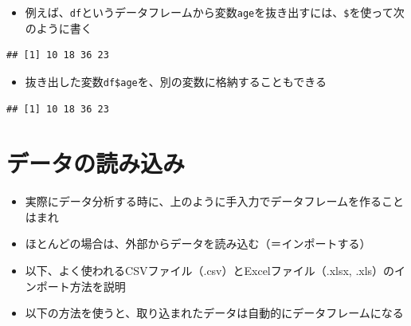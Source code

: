 \documentclass[
]{book}
\newenvironment{Shaded}{\begin{snugshade}}{\end{snugshade}}
\newcommand{\NormalTok}[1]{#1}
\newcommand{\OtherTok}[1]{\textcolor[rgb]{0.56,0.35,0.01}{#1}}
\newcommand{\SpecialCharTok}[1]{\textcolor[rgb]{0.00,0.00,0.00}{#1}}
\providecommand{\tightlist}{%
  \setlength{\itemsep}{0pt}\setlength{\parskip}{0pt}}
\begin{document}
\begin{itemize}
\tightlist
\item
  例えば、\texttt{df}というデータフレームから変数\texttt{age}を抜き出すには、\texttt{\$}を使って次のように書く
\end{itemize}

\begin{Shaded}
\end{Shaded}

\begin{verbatim}
## [1] 10 18 36 23
\end{verbatim}

\begin{itemize}
\tightlist
\item
  抜き出した変数\texttt{df\$age}を、別の変数に格納することもできる
\end{itemize}

\begin{Shaded}
\end{Shaded}

\begin{verbatim}
## [1] 10 18 36 23
\end{verbatim}

\hypertarget{ux30c7ux30fcux30bfux306eux8aadux307fux8fbcux307f-1}{%
\section{データの読み込み}\label{ux30c7ux30fcux30bfux306eux8aadux307fux8fbcux307f-1}}

\begin{itemize}
\tightlist
\item
  実際にデータ分析する時に、上のように手入力でデータフレームを作ることはまれ
\item
  ほとんどの場合は、外部からデータを読み込む（＝インポートする）
\item
  以下、よく使われるCSVファイル（.csv）とExcelファイル（.xlsx, .xls）のインポート方法を説明
\item
  以下の方法を使うと、取り込まれたデータは自動的にデータフレームになる
\end{itemize}
\end{document}
